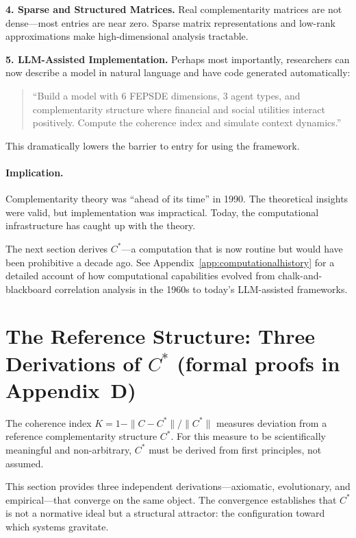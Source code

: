 \documentclass[12pt,a4paper]{article}
\begin{document}
\textbf{4. Sparse and Structured Matrices.}
Real complementarity matrices are not dense---most entries are near zero.
Sparse matrix representations and low-rank approximations
make high-dimensional analysis tractable.

\textbf{5. LLM-Assisted Implementation.}
Perhaps most importantly, researchers can now describe a model in natural language
and have code generated automatically:
\begin{quote}
``Build a model with 6 FEPSDE dimensions, 3 agent types, and 
complementarity structure where financial and social utilities interact positively.
Compute the coherence index and simulate context dynamics.''
\end{quote}

This dramatically lowers the barrier to entry for using the framework.

\paragraph{Implication.}
Complementarity theory was ``ahead of its time'' in 1990.
The theoretical insights were valid, but implementation was impractical.
Today, the computational infrastructure has caught up with the theory.

The next section derives $C^*$---a computation that is now routine
but would have been prohibitive a decade ago.
See Appendix~\ref{app:computationalhistory} for a detailed account of
how computational capabilities evolved from chalk-and-blackboard
correlation analysis in the 1960s to today's LLM-assisted frameworks.

\section{The Reference Structure: Three Derivations of $C^*$ (formal proofs in Appendix~D)}
\label{sec:cstar}

The coherence index $K = 1 - \|C - C^*\|/\|C^*\|$ measures deviation 
from a reference complementarity structure $C^*$.
For this measure to be scientifically meaningful and non-arbitrary,
$C^*$ must be derived from first principles, not assumed.

This section provides three independent derivations---axiomatic, 
evolutionary, and empirical---that converge on the same object.
The convergence establishes that $C^*$ is not a normative ideal
but a structural attractor: the configuration toward which systems gravitate.
\end{document}
